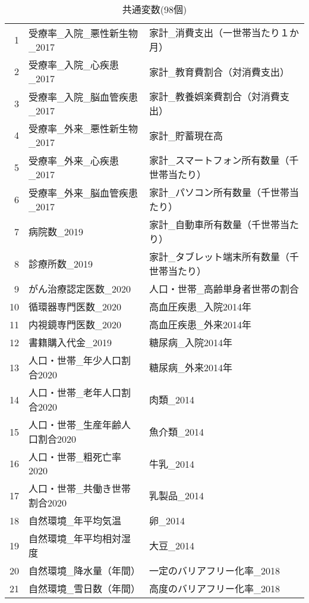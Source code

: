 \begin{table}[H]
\centering
\caption{共通変数(98個)}
\label{table_commom_d2.tex}
\begingroup\tiny

\begin{adjustbox}{width=1\textwidth}
\begin{tabular}{rll}
  \hline
  \hline
1 & 受療率\_入院\_悪性新生物\_2017 & 家計\_消費支出（一世帯当たり１か月） \\
  2 & 受療率\_入院\_心疾患\_2017 & 家計\_教育費割合（対消費支出） \\
  3 & 受療率\_入院\_脳血管疾患\_2017 & 家計\_教養娯楽費割合（対消費支出） \\
  4 & 受療率\_外来\_悪性新生物\_2017 & 家計\_貯蓄現在高 \\
  5 & 受療率\_外来\_心疾患\_2017 & 家計\_スマートフォン所有数量（千世帯当たり） \\
  6 & 受療率\_外来\_脳血管疾患\_2017 & 家計\_パソコン所有数量（千世帯当たり） \\
  7 & 病院数\_2019 & 家計\_自動車所有数量（千世帯当たり） \\
  8 & 診療所数\_2019 & 家計\_タブレット端末所有数量（千世帯当たり） \\
  9 & がん治療認定医数\_2020 & 人口・世帯\_高齢単身者世帯の割合 \\
  10 & 循環器専門医数\_2020 & 高血圧疾患\_入院2014年 \\
  11 & 内視鏡専門医数\_2020 & 高血圧疾患\_外来2014年 \\
  12 & 書籍購入代金\_2019 & 糖尿病\_入院2014年 \\
  13 & 人口・世帯\_年少人口割合2020 & 糖尿病\_外来2014年 \\
  14 & 人口・世帯\_老年人口割合2020 & 肉類\_2014 \\
  15 & 人口・世帯\_生産年齢人口割合2020 & 魚介類\_2014 \\
  16 & 人口・世帯\_粗死亡率2020 & 牛乳\_2014 \\
  17 & 人口・世帯\_共働き世帯割合2020 & 乳製品\_2014 \\
  18 & 自然環境\_年平均気温 & 卵\_2014 \\
  19 & 自然環境\_年平均相対湿度 & 大豆\_2014 \\
  20 & 自然環境\_降水量（年間） & 一定のバリアフリー化率\_2018 \\
  21 & 自然環境\_雪日数（年間） & 高度のバリアフリー化率\_2018 \\

\end{tabular}
\end{adjustbox}
\end{table}
